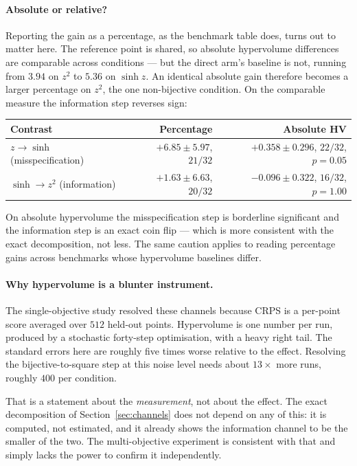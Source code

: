 \paragraph{Absolute or relative?} Reporting the gain as a percentage, as
the benchmark table does, turns out to matter here. The reference point is
shared, so absolute hypervolume differences are comparable across conditions
--- but the direct arm's baseline is not, running from $3.94$ on $z^2$ to
$5.36$ on $\sinh z$. An identical absolute gain therefore becomes a larger
percentage on $z^2$, the one non-bijective condition. On the comparable
measure the information step reverses sign:

\begin{center}
\begin{tabular}{lrr}
\toprule
Contrast & Percentage & Absolute HV \\
\midrule
$z \to \sinh$ (misspecification) & $+6.85\pm5.97$, $21/32$ & $+0.358\pm0.296$, $22/32$, $p=0.05$ \\
$\sinh \to z^2$ (information) & $+1.63\pm6.63$, $20/32$ & $-0.096\pm0.322$, $16/32$, $p=1.00$ \\
\bottomrule
\end{tabular}
\end{center}

\noindent On absolute hypervolume the misspecification step is borderline
significant and the information step is an exact coin flip --- which is more
consistent with the exact decomposition, not less. The same caution applies to
reading percentage gains across benchmarks whose hypervolume baselines differ.

\paragraph{Why hypervolume is a blunter instrument.} The single-objective study
resolved these channels because CRPS is a per-point score averaged over $512$
held-out points. Hypervolume is one number per run, produced by a stochastic
forty-step optimisation, with a heavy right tail. The standard errors here are
roughly five times worse relative to the effect. Resolving the
bijective-to-square step at this noise level needs about $13\times$ more runs,
roughly $400$ per condition.

That is a statement about the \emph{measurement}, not about the effect. The
exact decomposition of Section~\ref{sec:channels} does not depend on any of
this: it is computed, not estimated, and it already shows the information
channel to be the smaller of the two. The multi-objective experiment is
consistent with that and simply lacks the power to confirm it independently.

